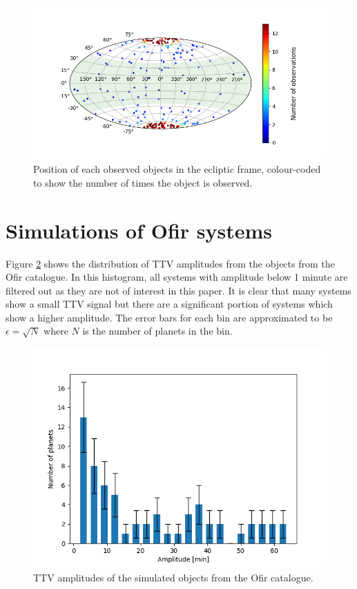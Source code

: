 \documentclass[12pt]{report}
\begin{document}
\begin{figure}[h!]
	\centering
	\includegraphics[width=\textwidth]{img/skymap_TESS_multi.png}
	  \caption{Position of each observed objects in the ecliptic frame, colour-coded to show the number of times the object is observed.}	
	  \label{fig:skymap_TESS}	
\end{figure}\newpage
\section{Simulations of Ofir systems}
	Figure \ref{fig:ampl_ofir} shows the distribution of TTV amplitudes from the objects from the Ofir catalogue. In this histogram, all systems with amplitude below 1 minute are filtered out as they are not of interest in this paper. It is clear that many systems show a small TTV signal but there are a significant portion of systems which show a higher amplitude. The error bars for each bin are approximated to be $\epsilon = \sqrt{N}$ where $N$ is the number of planets in the bin.
\begin{figure}
 	 \centering
	  \includegraphics[width=\textwidth]{img/ampl_ofir_66.png}
	  \caption{TTV amplitudes of the simulated objects from the Ofir catalogue.}
	 \label{fig:ampl_ofir}
\end{figure}  
\end{document}
